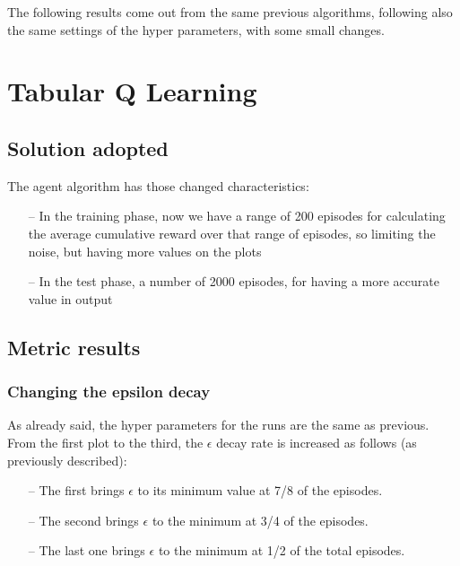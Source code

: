 \documentclass{article}
\begin{document}
The following results come out from the same previous algorithms, following also the same settings of the hyper parameters, with some small changes.

\section{Tabular Q Learning}

\subsection{Solution adopted}

The agent algorithm has those changed characteristics:
\begin{itemize}
\item[--] In the training phase, now we have a range of 200 episodes for calculating the average cumulative reward over that range of episodes, so limiting the noise, but having more values on the plots
\item[--] In the test phase, a number of 2000 episodes, for having a more accurate value in output
\end{itemize}

\subsection{Metric results}

\subsubsection{Changing the epsilon decay}

As already said, the hyper parameters for the runs are the same as previous.
\\
From the first plot to the third, the $\epsilon$ decay rate is increased as follows (as previously described):
\begin{itemize}
\item[--] The first brings $\epsilon$ to its minimum value at 7/8 of the episodes.
\item[--] The second brings $\epsilon$ to the minimum at 3/4 of the episodes.
\item[--] The last one brings $\epsilon$ to the minimum at 1/2 of the total episodes.
\end{itemize}

\begin{center}
\centering
{}
\end{center}
\end{document}

